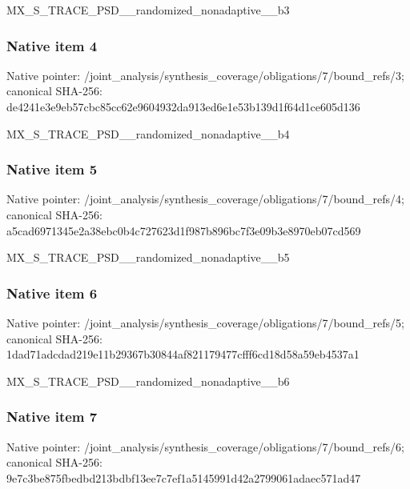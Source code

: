 \documentclass[10pt,a4paper]{article}
\begin{document}
\begingroup\raggedright\sloppy MX\_\allowbreak{}S\_\allowbreak{}TRACE\_\allowbreak{}PSD\_\allowbreak{}\_\allowbreak{}randomized\_\allowbreak{}nonadaptive\_\allowbreak{}\_\allowbreak{}b3\par\endgroup

\subsubsection{Native item 4}
Native pointer: /joint\_\allowbreak{}analysis/synthesis\_\allowbreak{}coverage/obligations/7/bound\_\allowbreak{}refs/3; canonical SHA-256: de4241e3e9eb57cbc85cc62e9604932da913ed6e1e53b139d1f64d1ce605d136

\begingroup\raggedright\sloppy MX\_\allowbreak{}S\_\allowbreak{}TRACE\_\allowbreak{}PSD\_\allowbreak{}\_\allowbreak{}randomized\_\allowbreak{}nonadaptive\_\allowbreak{}\_\allowbreak{}b4\par\endgroup

\subsubsection{Native item 5}
Native pointer: /joint\_\allowbreak{}analysis/synthesis\_\allowbreak{}coverage/obligations/7/bound\_\allowbreak{}refs/4; canonical SHA-256: a5cad6971345e2a38ebc0b4c727623d1f987b896bc7f3e09b3e8970eb07cd569

\begingroup\raggedright\sloppy MX\_\allowbreak{}S\_\allowbreak{}TRACE\_\allowbreak{}PSD\_\allowbreak{}\_\allowbreak{}randomized\_\allowbreak{}nonadaptive\_\allowbreak{}\_\allowbreak{}b5\par\endgroup

\subsubsection{Native item 6}
Native pointer: /joint\_\allowbreak{}analysis/synthesis\_\allowbreak{}coverage/obligations/7/bound\_\allowbreak{}refs/5; canonical SHA-256: 1dad71adcdad219e11b29367b30844af821179477cfff6cd18d58a59eb4537a1

\begingroup\raggedright\sloppy MX\_\allowbreak{}S\_\allowbreak{}TRACE\_\allowbreak{}PSD\_\allowbreak{}\_\allowbreak{}randomized\_\allowbreak{}nonadaptive\_\allowbreak{}\_\allowbreak{}b6\par\endgroup

\subsubsection{Native item 7}
Native pointer: /joint\_\allowbreak{}analysis/synthesis\_\allowbreak{}coverage/obligations/7/bound\_\allowbreak{}refs/6; canonical SHA-256: 9e7c3be875fbedbd213bdbf13ee7c7ef1a5145991d42a2799061adaec571ad47
\end{document}

